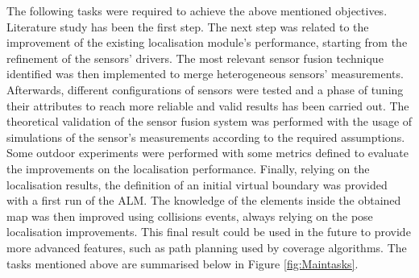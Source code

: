 The following tasks were required to achieve the above mentioned objectives.
Literature study has been the first step.
The next step was related to the improvement of the existing localisation module's performance, starting from the refinement of the sensors' drivers.
The most relevant sensor fusion technique identified was then implemented to merge heterogeneous sensors' measurements. %
Afterwards, different configurations of sensors were tested and a phase of tuning their attributes to reach more reliable and valid results has been carried out.
The theoretical validation of the sensor fusion system was performed with the usage of simulations of the sensor's measurements according to the required assumptions.
Some outdoor experiments were performed with some metrics defined to evaluate the improvements on the localisation performance.
Finally, relying on the localisation results, the definition of an initial virtual boundary was provided with a first run of the \gls{ALM}.
The knowledge of the elements inside the obtained map was then improved using collisions events, always relying on the pose localisation improvements.
This final result could be used in the future to provide more advanced features, such as path planning used by coverage algorithms.
The tasks mentioned above are summarised below in Figure \ref{fig:Maintasks}.
